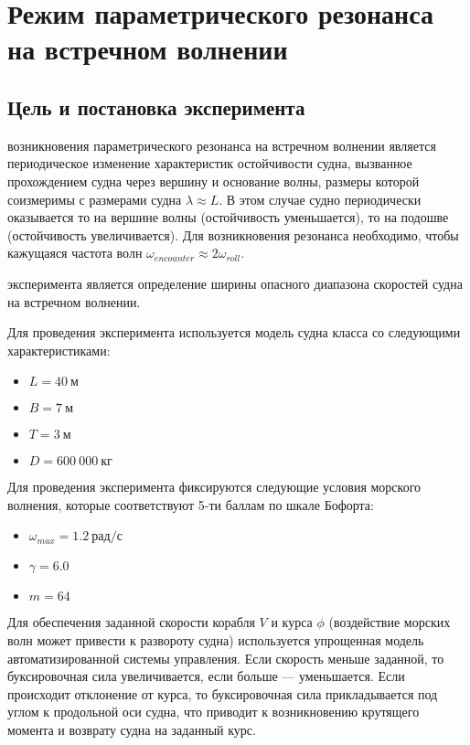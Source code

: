\section{Режим параметрического резонанса на встречном волнении}

\subsection{Цель и постановка эксперимента}

 возникновения параметрического резонанса на встречном волнении является периодическое изменение характеристик остойчивости судна, вызванное прохождением судна через вершину и основание волны, размеры которой соизмеримы с размерами судна $\lambda \approx L$. В этом случае судно периодически оказывается то на вершине волны (остойчивость уменьшается), то на подошве (остойчивость увеличивается). Для возникновения резонанса необходимо, чтобы кажущаяся частота волн $\omega_{encounter} \approx 2\omega_{roll}$.

 эксперимента является определение ширины опасного диапазона скоростей судна на встречном волнении.

Для проведения эксперимента используется модель судна класса  со следующими характеристиками:
\begin{itemize}
	\item	$L = 40\ \text{м}$
	\item	$B = 7\ \text{м}$
	\item	$T = 3\ \text{м}$
	\item	$D = 600\ 000\ \text{кг}$
\end{itemize}

Для проведения эксперимента фиксируются следующие условия морского волнения, которые соответствуют 5-ти баллам по шкале Бофорта:
\begin{itemize}
	\item	$\omega_{max} = 1.2\ \text{рад/с}$
	\item	$\gamma = 6.0$
	\item	$m = 64$
\end{itemize}

Для обеспечения заданной скорости корабля $V$ и курса $\phi$ (воздействие морских волн может привести к развороту судна) используется упрощенная модель автоматизированной системы управления. Если скорость меньше заданной, то буксировочная сила увеличивается, если больше --- уменьшается. Если происходит отклонение от курса, то буксировочная сила прикладывается под углом к продольной оси судна, что приводит к возникновению крутящего момента и возврату судна на заданный курс.

